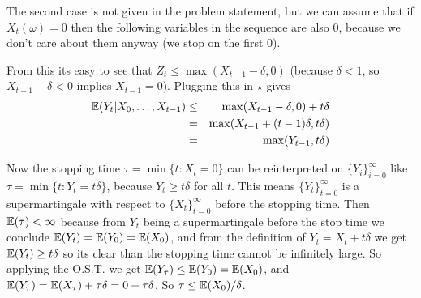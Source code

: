 \documentclass[a4paper]{article}
\begin{document}
The second case is not given in the problem statement, but we can assume that
if $ X_t(\omega) = 0 $ then the following variables in the sequence are also
$ 0 $, because we don't care about them anyway (we stop on the first $ 0 $).

From this its easy to see that $ Z_t \le \max(X_{t-1} - \delta, 0) $ (because
$ \delta < 1 $, so $ X_{t-1} - \delta < 0 $ implies $ X_{t-1} = 0 $). Plugging this in $ \star $ gives
\begin{eqnarray*}
\mathbb{E}(Y_t | X_0, \dots, X_{t-1})
  &\le& \max(X_{t-1} - \delta, 0) + t\delta \\
  &=& \max(X_{t-1} + (t-1)\delta, t\delta) \\
  &=& \max(Y_{t-1}, t\delta)
\end{eqnarray*}

Now the stopping time $ \tau = \min\{t : X_t = 0\} $ can be reinterpreted on
$ \{Y_i\}_{i=0}^{\infty} $ like $ \tau = \min\{t : Y_t = t\delta\} $, because
$ Y_t \ge t\delta $ for all $ t $. This means $ \{ Y_t \}_{t = 0}^{\infty} $ is
a supermartingale with respect to $ \{ X_t \}_{t = 0}^{\infty} $ before the stopping
time. Then $ \mathbb{E}(\tau) < \infty $ because from $ Y_t $ being a supermartingale before
the stop time we conclude $ \mathbb{E}(Y_t) = \mathbb{E}(Y_0) = \mathbb{E}(X_0) $, and from the
definition of $ Y_t = X_t + t\delta $ we get $ \mathbb{E}(Y_t) \ge t\delta $ so its
clear than the stopping time cannot be infinitely large. So applying the O.S.T.
we get $ \mathbb{E}(Y_\tau) \le \mathbb{E}(Y_0) = \mathbb{E}(X_0) $, and $ \mathbb{E}(Y_\tau) = \mathbb{E}(X_\tau)
+ \tau\delta = 0 + \tau\delta $. So $ \tau \le \mathbb{E}(X_0) / \delta $.
\end{document}
